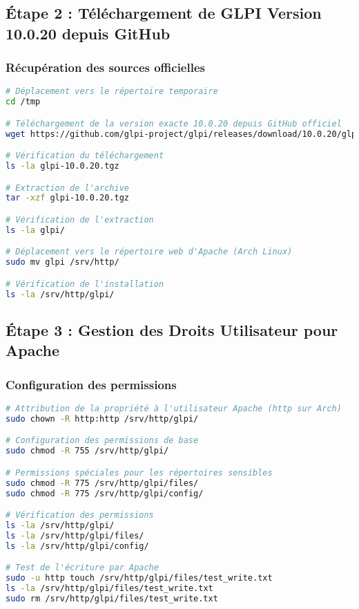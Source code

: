 \documentclass[12pt,a4paper]{article}
\begin{document}
\subsection{Étape 2 : Téléchargement de GLPI Version 10.0.20 depuis GitHub}

\subsubsection{Récupération des sources officielles}
\begin{lstlisting}[language=bash, caption=Téléchargement GLPI 10.0.20]
# Déplacement vers le répertoire temporaire
cd /tmp

# Téléchargement de la version exacte 10.0.20 depuis GitHub officiel
wget https://github.com/glpi-project/glpi/releases/download/10.0.20/glpi-10.0.20.tgz

# Vérification du téléchargement
ls -la glpi-10.0.20.tgz

# Extraction de l'archive
tar -xzf glpi-10.0.20.tgz

# Vérification de l'extraction
ls -la glpi/

# Déplacement vers le répertoire web d'Apache (Arch Linux)
sudo mv glpi /srv/http/

# Vérification de l'installation
ls -la /srv/http/glpi/
\end{lstlisting}

\subsection{Étape 3 : Gestion des Droits Utilisateur pour Apache}

\subsubsection{Configuration des permissions}
\begin{lstlisting}[language=bash, caption=Attribution des droits Apache sur Arch]
# Attribution de la propriété à l'utilisateur Apache (http sur Arch)
sudo chown -R http:http /srv/http/glpi/

# Configuration des permissions de base
sudo chmod -R 755 /srv/http/glpi/

# Permissions spéciales pour les répertoires sensibles
sudo chmod -R 775 /srv/http/glpi/files/
sudo chmod -R 775 /srv/http/glpi/config/

# Vérification des permissions
ls -la /srv/http/glpi/
ls -la /srv/http/glpi/files/
ls -la /srv/http/glpi/config/

# Test de l'écriture par Apache
sudo -u http touch /srv/http/glpi/files/test_write.txt
ls -la /srv/http/glpi/files/test_write.txt
sudo rm /srv/http/glpi/files/test_write.txt
\end{lstlisting}
\end{document}
